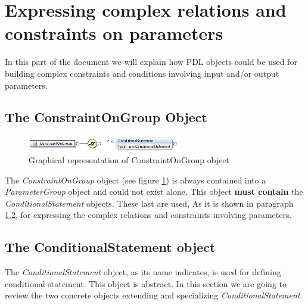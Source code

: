 \documentclass[a4paper,11pt] {article}
\begin{document}
\section{Expressing complex relations and constraints on parameters} 
In this part of the document we will explain how PDL objects could be used for building complex
constraints and conditions involving input and/or output parameters.

\subsection{The ConstraintOnGroup Object}\label{par-ConstraintsOnGroup}
\begin{figure}[htbp]
\begin{center}
\includegraphics[width=0.6\textwidth]{pictures/ConstraintOnGroup.jpg} 
\caption{Graphical representation of ConstraintOnGroup object}
\label{Pic-ConstraintOnGroup}
\end{center}
\end{figure}

The {\it  ConstraintOnGroup} object (see figure \ref{Pic-ConstraintOnGroup}) is always contained
into a {\it ParameterGroup} object and could not exist alone.
This object {\bf must contain} the {\it ConditionalStatement} objects. These last are used, As it is
shown in paragraph \ref{par-ConditionalStatement}, for expressing the complex relations and
constraints involving parameters.

\subsection{The ConditionalStatement object}\label{par-ConditionalStatement}
The {\it ConditionalStatement} object, as its name indicates, is used for defining conditional
statement. This object is abstract. In this section we are going to review the two concrete objects
extending and specializing  {\it ConditionalStatement}.
\end{document}
